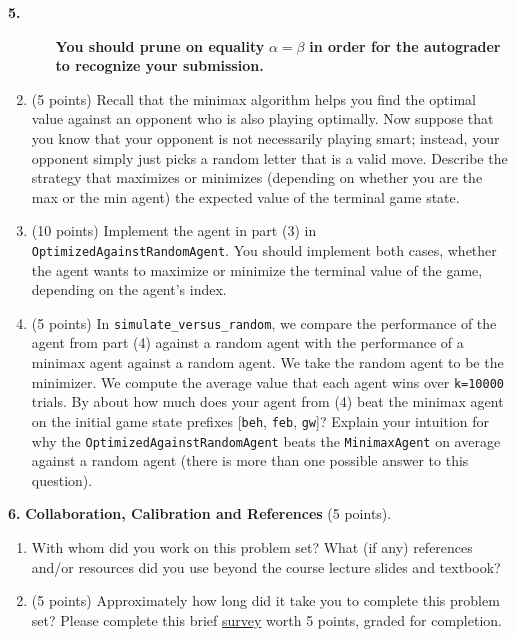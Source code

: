 \documentclass[12pt]{amsart}
\newenvironment{statement}[1]{\smallskip\noindent\color[rgb]{0.0,0.0,0.0} {\bf #1.}}{}
\newcommand{\1}{\mathds{1}}
\begin{document}
\begin{statement}{5}
\begin{enumerate}
\begin{enumerate}
    \textbf{You should prune on equality} $\alpha=\beta$ \textbf{in order for the autograder to recognize your submission.}
    \end{enumerate}
    \item (5 points) Recall that the minimax algorithm helps you find the optimal value against an opponent who is also playing optimally. Now suppose that you know that your opponent is not necessarily playing smart; instead, your opponent simply just picks a random letter that is a valid move.
    Describe the strategy that maximizes or minimizes (depending on whether you are the max or the min agent) the expected value of the terminal game state.
    \item (10 points) Implement the agent in part (3) in \texttt{OptimizedAgainstRandomAgent}. You should implement both cases, whether the agent wants to maximize or minimize the terminal value of the game, depending on the agent's index.
    \item (5 points) In \texttt{simulate\_versus\_random}, we compare the performance of the agent from part (4) against a random agent with the performance of a minimax agent against a random agent.
    We take the random agent to be the minimizer.
    We compute the average value that each agent wins over \texttt{k=10000} trials. By about how much does your agent from (4) beat the minimax agent on the initial game state prefixes  [\texttt{beh}, \texttt{feb}, \texttt{gw}]?
    Explain your intuition for why the \texttt{OptimizedAgainstRandomAgent} beats the \texttt{MinimaxAgent} on average against a random agent (there is more than one possible answer to this question).
\end{enumerate}
\end{statement}

\newpage

\begin{statement}{6}
\noindent \textbf{Collaboration, Calibration and References} (5 points).
\begin{enumerate}
    \item With whom did you work on this problem set? What (if any) references and/or resources did you use beyond the course lecture slides and textbook? 
    \item (5 points) Approximately how long did it take you to complete this problem set? Please complete this brief \href{https://forms.gle/S3UGVtR8jDf4gQvN7}{survey} worth 5 points, graded for completion.
\end{enumerate}
\end{statement}
\end{document}
